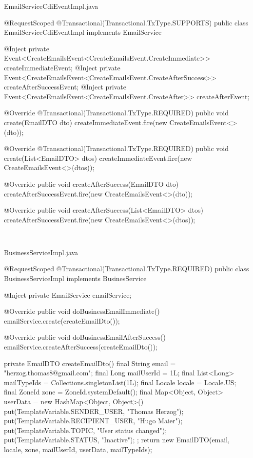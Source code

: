 \begin{program}[h]
\caption{EmailServiceCdiEventImpl.java}
\label{prog:emailServiceCdiEventImpl}
\begin{JavaCode}
@RequestScoped
@Transactional(Transactional.TxType.SUPPORTS)
public class EmailServiceCdiEventImpl implements EmailService {
    @Inject
    private Event<CreateEmailsEvent<CreateEmailsEvent.CreateImmediate>> createImmediateEvent;
    @Inject
    private Event<CreateEmailsEvent<CreateEmailsEvent.CreateAfterSuccess>> createAfterSuccessEvent;
    @Inject
    private Event<CreateEmailsEvent<CreateEmailsEvent.CreateAfter>> createAfterEvent;

    @Override
    @Transactional(Transactional.TxType.REQUIRED)
    public void create(EmailDTO dto) {
        createImmediateEvent.fire(new CreateEmailsEvent<>(dto));
    }

    @Override
    @Transactional(Transactional.TxType.REQUIRED)
    public void create(List<EmailDTO> dtos) {
        createImmediateEvent.fire(new CreateEmailsEvent<>(dtos));
    }

    @Override
    public void createAfterSuccess(EmailDTO dto) {
        createAfterSuccessEvent.fire(new CreateEmailsEvent<>(dto));
    }

    @Override
    public void createAfterSuccess(List<EmailDTO> dtos) {
        createAfterSuccessEvent.fire(new CreateEmailsEvent<>(dtos));
    }
}
\end{JavaCode}
\end{program}
\ \newpage
\begin{program}[h]
\caption{BusinessServiceImpl.java}
\label{prog:businessServiceImpl}
\begin{JavaCode}
@RequestScoped
@Transactional(Transactional.TxType.REQUIRED)
public class BusinessServiceImpl implements BusinesService {

    @Inject
    private EmailService emailService;

    @Override
    public void doBusinessEmailImmediate() {
        emailService.create(createEmailDto());
    }

    @Override
    public void doBusinessEmailAfterSuccess() {
        emailService.createAfterSuccess(createEmailDto());
    }

    private EmailDTO createEmailDto() {
        final String email = "herzog.thomas8@gmail.com";
        final Long mailUserId = 1L;
        final List<Long> mailTypeIds = Collections.singletonList(1L);
        final Locale locale = Locale.US;
        final ZoneId zone = ZoneId.systemDefault();
        final Map<Object, Object> userData = 
        	new HashMap<Object, Object>() {{
                put(TemplateVariable.SENDER_USER, "Thomas Herzog");
                put(TemplateVariable.RECIPIENT_USER, "Hugo Maier");
                put(TemplateVariable.TOPIC, "User status changed");
                put(TemplateVariable.STATUS, "Inactive");
            }};
        return new EmailDTO(email, 
        					locale, 
        					zone, 
        					mailUserId, 
        					userData, 
        					mailTypeIds);
    }
}
\end{JavaCode}
\end{program}
